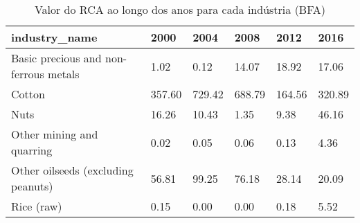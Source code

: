 \begin{table}
\centering
\caption{Valor do RCA ao longo dos anos para cada indústria (BFA)}
\begin{tabular}{p{6cm}p{1.5cm}p{1.5cm}p{1.5cm}p{1.5cm}p{1.5cm}}
\toprule
                        industry\_name &   2000 &   2004 &   2008 &   2012 &   2016 \\
\midrule
Basic precious and non-ferrous metals &   1.02 &   0.12 &  14.07 &  18.92 &  17.06 \\
                               Cotton & 357.60 & 729.42 & 688.79 & 164.56 & 320.89 \\
                                 Nuts &  16.26 &  10.43 &   1.35 &   9.38 &  46.16 \\
            Other mining and quarring &   0.02 &   0.05 &   0.06 &   0.13 &   4.36 \\
   Other oilseeds (excluding peanuts) &  56.81 &  99.25 &  76.18 &  28.14 &  20.09 \\
                           Rice (raw) &   0.15 &   0.00 &   0.00 &   0.18 &   5.52 \\
\bottomrule
\end{tabular}
\end{table}
